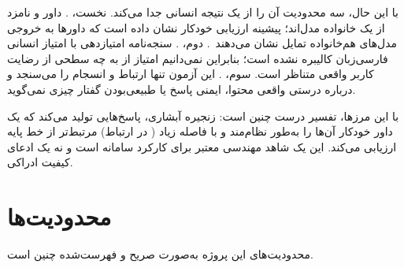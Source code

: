با این حال، سه محدودیت آن را از یک نتیجه انسانی جدا می‌کند. نخست،
. داور و نامزد از یک خانواده مدل‌اند؛
پیشینه ارزیابی خودکار نشان داده است که داورها به خروجی مدل‌های
هم‌خانواده تمایل نشان می‌دهند~\cite{zheng2023mtbench}. دوم،
. سنجه‌نامه امتیازدهی با امتیاز انسانی
فارسی‌زبان کالیبره نشده است؛ بنابراین نمی‌دانیم امتیاز  از
 به چه سطحی از رضایت کاربر واقعی متناظر است. سوم،
. این آزمون تنها ارتباط و انسجام را می‌سنجد و درباره
درستی واقعی محتوا، ایمنی پاسخ یا طبیعی‌بودن گفتار چیزی نمی‌گوید.

با این مرزها، تفسیر درست چنین است: زنجیره آبشاری، پاسخ‌هایی تولید می‌کند
که یک داور خودکار آن‌ها را به‌طور نظام‌مند و با فاصله زیاد
( در ارتباط) مرتبط‌تر از خط پایه ارزیابی می‌کند. این یک شاهد
مهندسی معتبر برای کارکرد سامانه است و نه یک ادعای کیفیت ادراکی.

\section{محدودیت‌ها}
\label{sec:limitations}

محدودیت‌های این پروژه به‌صورت صریح و فهرست‌شده چنین است.

